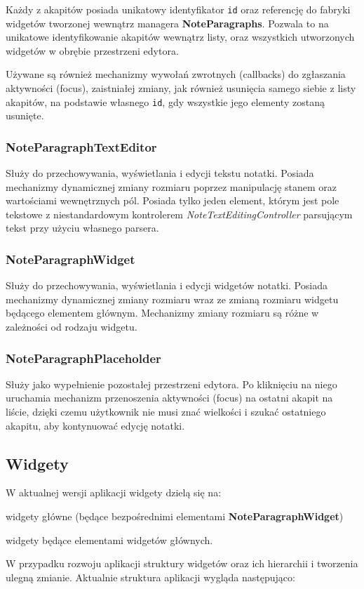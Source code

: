 Każdy z akapitów posiada unikatowy identyfikator \texttt{id} oraz referencję do fabryki widgetów tworzonej wewnątrz managera \textbf{NoteParagraphs}.
Pozwala to na unikatowe identyfikowanie akapitów wewnątrz listy, oraz wszystkich utworzonych widgetów w obrębie przestrzeni edytora.

Używane są również mechanizmy wywołań zwrotnych (callbacks) do zgłaszania aktywności (focus), zaistniałej zmiany, jak również usunięcia samego siebie z listy akapitów, na podstawie własnego \texttt{id}, gdy wszystkie jego elementy zostaną usunięte.

\subsubsection{NoteParagraphTextEditor}

Służy do przechowywania, wyświetlania i edycji tekstu notatki. Posiada mechanizmy dynamicznej zmiany rozmiaru poprzez manipulację stanem oraz wartościami wewnętrznych pól. Posiada tylko jeden element, którym jest pole tekstowe z niestandardowym kontrolerem \textit{NoteTextEditingController} parsującym tekst przy użyciu własnego parsera.

\subsubsection{NoteParagraphWidget}

Służy do przechowywania, wyświetlania i edycji widgetów notatki. Posiada mechanizmy dynamicznej zmiany rozmiaru wraz ze zmianą rozmiaru widgetu będącego elementem głównym. Mechanizmy zmiany rozmiaru są różne w zależności od rodzaju widgetu.

\subsubsection{NoteParagraphPlaceholder}

Służy jako wypełnienie pozostałej przestrzeni edytora. Po kliknięciu na niego uruchamia mechanizm przenoszenia aktywności (focus) na ostatni akapit na liście, dzięki czemu użytkownik nie musi znać wielkości i szukać ostatniego akapitu, aby kontynuować edycję notatki.

\newpage

\subsection{Widgety}

W aktualnej wersji aplikacji widgety dzielą się na:
\begin{compactitem}
    \item widgety główne (będące bezpośrednimi elementami \textbf{NoteParagraphWidget})
    \item widgety będące elementami widgetów głównych.
\end{compactitem}
W przypadku rozwoju aplikacji struktury widgetów oraz ich hierarchii i tworzenia ulegną zmianie. Aktualnie struktura aplikacji wygląda następująco:

